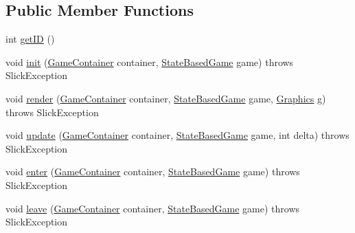 \subsection*{Public Member Functions}
\begin{DoxyCompactItemize}
\item 
int \mbox{\hyperlink{interfaceorg_1_1newdawn_1_1slick_1_1state_1_1_game_state_a54f2bc6a91feaf0614a5ef19f1d03313}{get\+ID}} ()
\item 
void \mbox{\hyperlink{interfaceorg_1_1newdawn_1_1slick_1_1state_1_1_game_state_aa799a369e0fcfe6822d2d586fa6f5bbc}{init}} (\mbox{\hyperlink{classorg_1_1newdawn_1_1slick_1_1_game_container}{Game\+Container}} container, \mbox{\hyperlink{classorg_1_1newdawn_1_1slick_1_1state_1_1_state_based_game}{State\+Based\+Game}} game)  throws Slick\+Exception
\item 
void \mbox{\hyperlink{interfaceorg_1_1newdawn_1_1slick_1_1state_1_1_game_state_a065352d2725274c5244cd022f226eb17}{render}} (\mbox{\hyperlink{classorg_1_1newdawn_1_1slick_1_1_game_container}{Game\+Container}} container, \mbox{\hyperlink{classorg_1_1newdawn_1_1slick_1_1state_1_1_state_based_game}{State\+Based\+Game}} game, \mbox{\hyperlink{classorg_1_1newdawn_1_1slick_1_1_graphics}{Graphics}} g)  throws Slick\+Exception
\item 
void \mbox{\hyperlink{interfaceorg_1_1newdawn_1_1slick_1_1state_1_1_game_state_ab5ec3bc37a9bd1eb5679577408c562c1}{update}} (\mbox{\hyperlink{classorg_1_1newdawn_1_1slick_1_1_game_container}{Game\+Container}} container, \mbox{\hyperlink{classorg_1_1newdawn_1_1slick_1_1state_1_1_state_based_game}{State\+Based\+Game}} game, int delta)  throws Slick\+Exception 
\item 
void \mbox{\hyperlink{interfaceorg_1_1newdawn_1_1slick_1_1state_1_1_game_state_ad5fc28eca9bed5ca50fffa9adf138884}{enter}} (\mbox{\hyperlink{classorg_1_1newdawn_1_1slick_1_1_game_container}{Game\+Container}} container, \mbox{\hyperlink{classorg_1_1newdawn_1_1slick_1_1state_1_1_state_based_game}{State\+Based\+Game}} game)  throws Slick\+Exception
\item 
void \mbox{\hyperlink{interfaceorg_1_1newdawn_1_1slick_1_1state_1_1_game_state_a3198498951e2674dac79b3c81f7af0f0}{leave}} (\mbox{\hyperlink{classorg_1_1newdawn_1_1slick_1_1_game_container}{Game\+Container}} container, \mbox{\hyperlink{classorg_1_1newdawn_1_1slick_1_1state_1_1_state_based_game}{State\+Based\+Game}} game)  throws Slick\+Exception
\end{DoxyCompactItemize}


